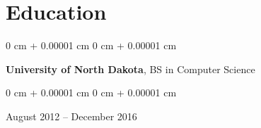 \documentclass[10pt, letterpaper]{article}
\newenvironment{onecolentry}{
    \begin{adjustwidth}{
        0 cm + 0.00001 cm
    }{
        0 cm + 0.00001 cm
    }
}{
    \end{adjustwidth}
} %
\begin{document}
\vspace{0.2 cm}

\section{Education}
\begin{onecolentry}
    \textbf{University of North Dakota}, BS in Computer Science
\end{onecolentry}
\begin{onecolentry}
    August 2012 – December 2016
\end{onecolentry}
\end{document}
